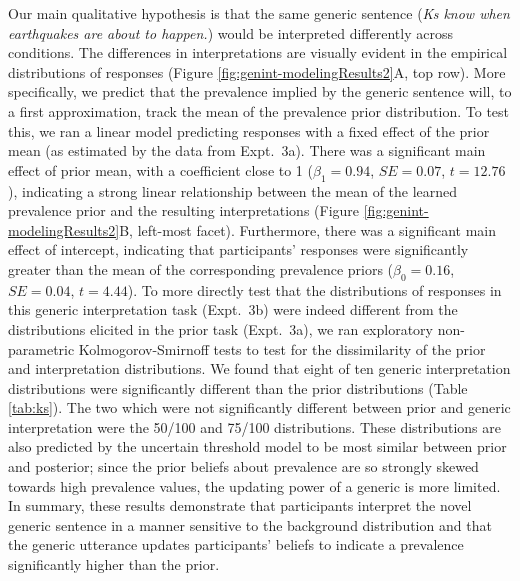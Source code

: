 \documentclass[floatsintext,man]{apa6}
\begin{document}
Our main qualitative hypothesis is that the same generic sentence (\emph{Ks know when earthquakes are about to happen.}) would be interpreted differently across conditions.
The differences in interpretations are visually evident in the empirical distributions of responses (Figure \ref{fig:genint-modelingResults2}A, top row).
More specifically, we predict that the prevalence implied by the generic sentence will, to a first approximation, track the mean of the prevalence prior distribution.
To test this, we ran a linear model predicting responses with a fixed effect of the prior mean (as estimated by the data from Expt.~3a).
There was a significant main effect of prior mean, with a coefficient close to 1 (\(\beta_1 = 0.94\), \(SE=0.07\), \(t = 12.76\)), indicating a strong linear relationship between the mean of the learned prevalence prior and the resulting interpretations (Figure \ref{fig:genint-modelingResults2}B, left-most facet).
Furthermore, there was a significant main effect of intercept, indicating that participants' responses were significantly greater than the mean of the corresponding prevalence priors (\(\beta_0 = 0.16\), \(SE=0.04\), \(t = 4.44\)).
To more directly test that the distributions of responses in this generic interpretation task (Expt.~3b) were indeed different from the distributions elicited in the prior task (Expt.~3a), we ran exploratory non-parametric Kolmogorov-Smirnoff tests to test for the dissimilarity of the prior and interpretation distributions.  
We found that eight of ten generic interpretation distributions were significantly different than the prior distributions (Table \ref{tab:ks}).
The two which were not significantly different between prior and generic interpretation were the 50/100 and 75/100 distributions. These distributions are also predicted by the uncertain threshold model to be most similar between prior and posterior; since the prior beliefs about prevalence are so strongly skewed towards high prevalence values, the updating power of a generic is more limited.
In summary, these results demonstrate that participants interpret the novel generic sentence in a manner sensitive to the background distribution and that the generic utterance updates participants' beliefs to indicate a prevalence significantly higher than the prior.
\end{document}
